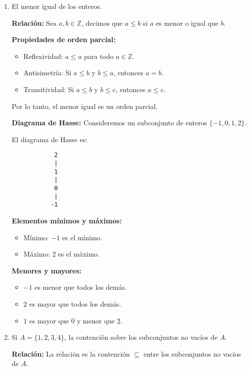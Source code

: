 \begin{solution}
\begin{enumerate}
        \item El menor igual de los enteros.

        \textbf{Relación:}
        Sea \( a, b \in \mathbb{Z} \), decimos que \( a \leq b \) si \( a \) es menor o igual que \( b \).
        
        \textbf{Propiedades de orden parcial:}
        \begin{itemize}
            \item Reflexividad: \( a \leq a \) para todo \( a \in \mathbb{Z} \).
            \item Antisimetría: Si \( a \leq b \) y \( b \leq a \), entonces \( a = b \).
            \item Transitividad: Si \( a \leq b \) y \( b \leq c \), entonces \( a \leq c \).
        \end{itemize}
        
        Por lo tanto, el menor igual es un orden parcial.
        
        \textbf{Diagrama de Hasse:}
        Consideremos un subconjunto de enteros \( \{-1, 0, 1, 2\} \).
        
        El diagrama de Hasse es:
        \begin{verbatim}
            2
            |
            1
            |
            0
            |
           -1
        \end{verbatim}
        
        \textbf{Elementos mínimos y máximos:}
        \begin{itemize}
            \item Mínimo: \( -1 \) es el mínimo.
            \item Máximo: \( 2 \) es el máximo.
        \end{itemize}
        
        \textbf{Menores y mayores:}
        \begin{itemize}
            \item \( -1 \) es menor que todos los demás.
            \item \( 2 \) es mayor que todos los demás.
            \item \( 1 \) es mayor que \( 0 \) y menor que \( 2 \).
        \end{itemize}
        
        \item Si \( A = \{1, 2, 3, 4\} \), la contención sobre los subconjuntos no vacíos de \( A \).

        \textbf{Relación:}
        La relación es la contención \( \subseteq \) entre los subconjuntos no vacíos de \( A \).
        

\end{enumerate}
\end{solution}
